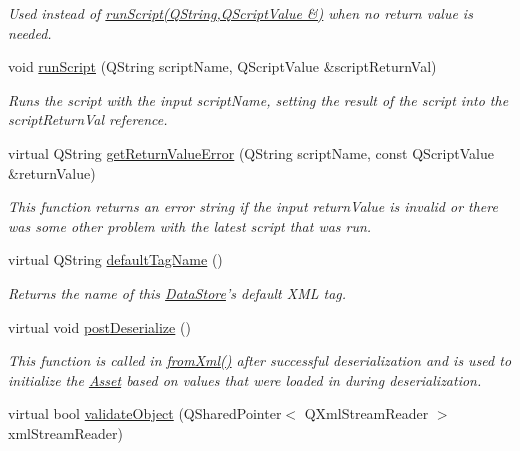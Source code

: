 \begin{DoxyCompactItemize}
\begin{DoxyCompactList}\small\item\em Used instead of \hyperlink{class_picto_1_1_scriptable_container_a552fa1d97408cd4893c7f7ddd9213021}{run\-Script(\-Q\-String,\-Q\-Script\-Value \&)} when no return value is needed. \end{DoxyCompactList}\item 
void \hyperlink{class_picto_1_1_scriptable_container_a552fa1d97408cd4893c7f7ddd9213021}{run\-Script} (Q\-String script\-Name, Q\-Script\-Value \&script\-Return\-Val)
\begin{DoxyCompactList}\small\item\em Runs the script with the input script\-Name, setting the result of the script into the script\-Return\-Val reference. \end{DoxyCompactList}\item 
virtual Q\-String \hyperlink{class_picto_1_1_scriptable_container_a1e0264aee7ce551d450dc07a6b369d56}{get\-Return\-Value\-Error} (Q\-String script\-Name, const Q\-Script\-Value \&return\-Value)
\begin{DoxyCompactList}\small\item\em This function returns an error string if the input return\-Value is invalid or there was some other problem with the latest script that was run. \end{DoxyCompactList}\item 
virtual Q\-String \hyperlink{class_picto_1_1_scriptable_container_a5721f31da49f2e8df266e0a6c40317fe}{default\-Tag\-Name} ()
\begin{DoxyCompactList}\small\item\em Returns the name of this \hyperlink{class_picto_1_1_data_store}{Data\-Store}'s default X\-M\-L tag. \end{DoxyCompactList}\item 
virtual void \hyperlink{class_picto_1_1_scriptable_container_a0654af2c08f9a6c967a21b57614950ba}{post\-Deserialize} ()
\begin{DoxyCompactList}\small\item\em This function is called in \hyperlink{class_picto_1_1_asset_a8bed4da09ecb1c07ce0dab313a9aba67}{from\-Xml()} after successful deserialization and is used to initialize the \hyperlink{class_picto_1_1_asset}{Asset} based on values that were loaded in during deserialization. \end{DoxyCompactList}\item 
\hypertarget{class_picto_1_1_scriptable_container_a127c17469b1823ce4368bbf9d5df7b78}{virtual bool \hyperlink{class_picto_1_1_scriptable_container_a127c17469b1823ce4368bbf9d5df7b78}{validate\-Object} (Q\-Shared\-Pointer$<$ Q\-Xml\-Stream\-Reader $>$ xml\-Stream\-Reader)}\label{class_picto_1_1_scriptable_container_a127c17469b1823ce4368bbf9d5df7b78}


\end{DoxyCompactItemize}
